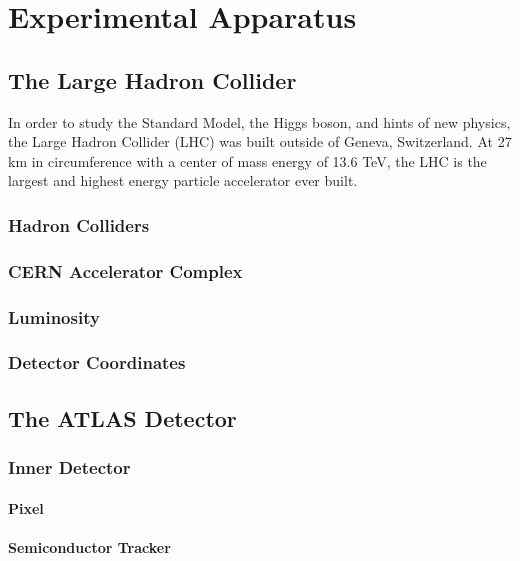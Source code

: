 \chapter{Experimental Apparatus}

\section{The Large Hadron Collider}
	In order to study the Standard Model, the Higgs boson, and hints of new physics, the Large Hadron Collider (LHC) was built outside of Geneva, Switzerland. At 27 km in circumference with a center of mass energy of 13.6 TeV, the LHC is the largest and highest energy particle accelerator ever built.

	\subsection{Hadron Colliders}

	\subsection{CERN Accelerator Complex}

	\subsection{Luminosity}

	\subsection{Detector Coordinates}

\section{The ATLAS Detector}

	\subsection{Inner Detector}

		\subsubsection{Pixel}

		\subsubsection{Semiconductor Tracker}

